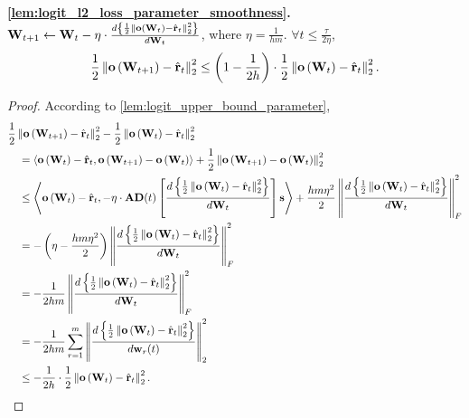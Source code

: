 {\bf \cref{lem:logit_l2_loss_parameter_smoothness}.} ${\mathbf{W}}_{t+1} \leftarrow {\mathbf{W}}_t - \eta \cdot \frac{d \left\{ \frac{1}{2} \left\| {\mathbf{o}}\left( {\mathbf{W}}_t\right) - \hat{{\mathbf{r}}}_t \right\|_2^2 \right\}}{d {\mathbf{W}}_t}$, where $\eta = \frac{1}{h m}$. $\forall t \le \frac{\tau}{2 \eta}$,
\begin{equation*}
\begin{split}
    \frac{1}{2} \left\| {\mathbf{o}}\left( {\mathbf{W}}_{t+1} \right) - \hat{{\mathbf{r}}}_t \right\|_2^2 \le \left( 1 - \frac{1}{2 h} \right) \cdot \frac{1}{2} \left\| {\mathbf{o}}\left( {\mathbf{W}}_t \right) - \hat{{\mathbf{r}}}_t \right\|_2^2.
\end{split}
\end{equation*}
\begin{proof}
According to \cref{lem:logit_upper_bound_parameter},
\begin{equation*}
\begin{split}
    &\frac{1}{2} \left\| {\mathbf{o}}\left( {\mathbf{W}}_{t+1} \right) - \hat{{\mathbf{r}}}_t \right\|_2^2 - \frac{1}{2} \left\| {\mathbf{o}}\left( {\mathbf{W}}_t \right) - \hat{{\mathbf{r}}}_t \right\|_2^2 \\
    &\quad = \left\langle {\mathbf{o}}\left( {\mathbf{W}}_t \right) - \hat{{\mathbf{r}}}_t, {\mathbf{o}}\left( {\mathbf{W}}_{t+1} \right) - {\mathbf{o}}\left( {\mathbf{W}}_t \right) \right\rangle + \frac{1}{2} \left\| {\mathbf{o}}\left( {\mathbf{W}}_{t+1} \right) - {\mathbf{o}}\left( {\mathbf{W}}_t \right) \right\|_2^2 \\
    &\quad \le \left\langle {\mathbf{o}}\left( {\mathbf{W}}_t \right) - \hat{{\mathbf{r}}}_t, - \eta \cdot {\mathbf{A}} {\mathbf{D}}(t) \left[ \frac{d \left\{ \frac{1}{2} \left\| {\mathbf{o}}\left( {\mathbf{W}}_t\right) - \hat{{\mathbf{r}}}_t \right\|_2^2 \right\}}{d {\mathbf{W}}_t} \right] {\mathbf{s}} \right\rangle + \frac{h m \eta^2}{2} \left\| \frac{d \left\{ \frac{1}{2} \left\| {\mathbf{o}}\left( {\mathbf{W}}_t\right) - \hat{{\mathbf{r}}}_t \right\|_2^2 \right\}}{d {\mathbf{W}}_t}  \right\|_F^2 \\
    &\quad = - \left( \eta - \frac{h m \eta^2}{2} \right) \left\| \frac{d \left\{ \frac{1}{2} \left\| {\mathbf{o}}\left( {\mathbf{W}}_t\right) - \hat{{\mathbf{r}}}_t \right\|_2^2 \right\}}{d {\mathbf{W}}_t}  \right\|_F^2 \\
    &\quad = - \frac{1}{2 h m} \left\| \frac{d \left\{ \frac{1}{2} \left\| {\mathbf{o}}\left( {\mathbf{W}}_t\right) - \hat{{\mathbf{r}}}_t \right\|_2^2 \right\}}{d {\mathbf{W}}_t}  \right\|_F^2 \\
    &\quad = - \frac{1}{2 h m} \sum\limits_{r = 1}^{m}{ \left\| \frac{d \left\{ \frac{1}{2} \left\| {\mathbf{o}}\left( {\mathbf{W}}_t\right) - \hat{{\mathbf{r}}}_t \right\|_2^2 \right\}}{d {\mathbf{w}}_r(t)}  \right\|_2^2 } \\
    &\quad \le - \frac{1}{2 h} \cdot \frac{1}{2} \left\| {\mathbf{o}}\left( {\mathbf{W}}_t\right) - \hat{{\mathbf{r}}}_t \right\|_2^2. \qedhere
\end{split}
\end{equation*}
\end{proof}

